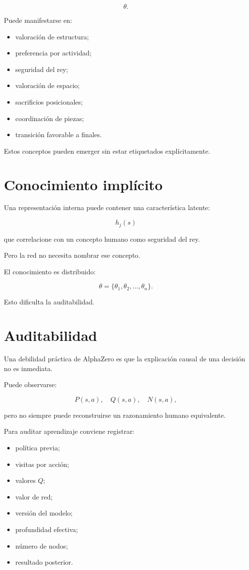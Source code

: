 \documentclass[11pt,a4paper]{article}
\begin{document}
\[
\theta.
\]

Puede manifestarse en:

\begin{itemize}
    \item valoración de estructura;
    \item preferencia por actividad;
    \item seguridad del rey;
    \item valoración de espacio;
    \item sacrificios posicionales;
    \item coordinación de piezas;
    \item transición favorable a finales.
\end{itemize}

Estos conceptos pueden emerger sin estar etiquetados explícitamente.

\section{Conocimiento implícito}

Una representación interna puede contener una característica latente:

\[
h_j(s)
\]

que correlacione con un concepto humano como seguridad del rey.

Pero la red no necesita nombrar ese concepto.

El conocimiento es distribuido:

\[
\theta
=
\{\theta_1,\theta_2,\ldots,\theta_n\}.
\]

Esto dificulta la auditabilidad.

\section{Auditabilidad}

Una debilidad práctica de AlphaZero es que la explicación causal de una decisión no es inmediata.

Puede observarse:

\[
P(s,a),
\quad
Q(s,a),
\quad
N(s,a),
\]

pero no siempre puede reconstruirse un razonamiento humano equivalente.

Para auditar aprendizaje conviene registrar:

\begin{itemize}
    \item política previa;
    \item visitas por acción;
    \item valores \(Q\);
    \item valor de red;
    \item versión del modelo;
    \item profundidad efectiva;
    \item número de nodos;
    \item resultado posterior.
\end{itemize}
\end{document}
